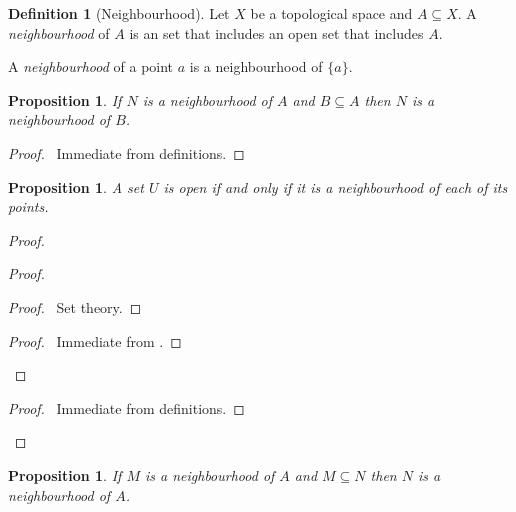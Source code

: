 \documentclass{report}
\let\qed\relax
\newtheorem{prop}[lm]{Proposition}
\theoremstyle{definition}
\newtheorem{df}[lm]{Definition}
\begin{document}
  \begin{df}[Neighbourhood]
    Let $X$ be a topological space and $A \subseteq X$. A \emph{neighbourhood}
    of $A$ is an set that includes an open set that includes $A$.

    A \emph{neighbourhood} of a point $a$ is a neighbourhood of $\{a\}$.
  \end{df}

  \begin{prop}
    If $N$ is a neighbourhood of $A$ and $B \subseteq A$ then $N$ is a
    neighbourhood of $B$.
  \end{prop}

  \begin{proof}
    \pf\ Immediate from definitions. \qed
  \end{proof}

  \begin{prop}
    \label{prop:topology:neighbourhood:open}
    A set $U$ is open if and only if it is a neighbourhood of each of its
    points.
  \end{prop}

  \begin{proof}
    \pf
    \begin{proof}
      \begin{proof}
        \pf\ Set theory.
      \end{proof}
      \begin{proof}
        \pf\ Immediate from .
      \end{proof}
    \end{proof}
    \begin{proof}
      \pf\ Immediate from definitions.
    \end{proof}
    \qed
  \end{proof}

  \begin{prop}
    \label{prop:topology:neighbourhood:monotone}
    If $M$ is a neighbourhood of $A$ and $M \subseteq N$ then $N$ is a
    neighbourhood of $A$.
  \end{prop}
\end{document}
